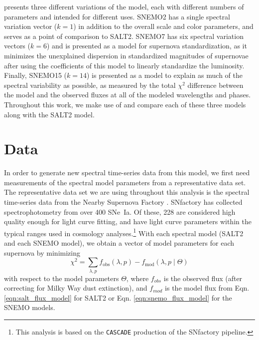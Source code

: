 \cite{saunders_snemo_2018} presents three different variations of the model, each with different numbers of parameters and intended for different uses. SNEMO2 has a single spectral variation vector ($k=1$) in addition to the overall scale and color parameters, and serves as a point of comparison to SALT2. SNEMO7 has six spectral variation vectors ($k=6$) and is presented as a model for supernova standardization, as it minimizes the unexplained dispersion in standardized magnitudes of supernovae after using the coefficients of this model to linearly standardize the luminosity. Finally, SNEMO15 ($k=14$) is presented as a model to explain as much of the spectral variability as possible, as measured by the total $\chi^2$ difference between the model and the observed fluxes at all of the modeled wavelengths and phases. Throughout this work, we make use of and compare each of these three models along with the SALT2 model.

\section{Data}
\label{sec:data}
In order to generate new spectral time-series data from this model, we first need measurements of the spectral model parameters from a representative data set. The representative data set we are using throughout this analysis is the spectral time-series data from the Nearby Supernova Factory \citep[SNfactory;][]{aldering_overview_2002}. SNfactory has collected spectrophotometry from over 400 SNe~Ia. Of these, 228 are considered high quality enough for light curve fitting, and have light curve parameters within the typical ranges used in cosmology analyses.\footnote{This analysis is based on the \texttt{CASCADE} production of the SNfactory pipeline.} With each spectral model (SALT2 and each SNEMO model), we obtain a vector of model parameters for each supernova by minimizing
\begin{equation}
    \chi^2 = \displaystyle\sum_{\lambda, p} f_\text{obs}(\lambda, p) - f_\text{mod}(\lambda, p\;|\; \Theta)
\end{equation}
with respect to the model parameters $\Theta$, where $f_{obs}$ is the observed flux (after correcting for Milky Way dust extinction), and $f_{mod}$ is the model flux from Eqn. \ref{eqn:salt_flux_model} for SALT2 or Eqn. \ref{eqn:snemo_flux_model} for the SNEMO models.

